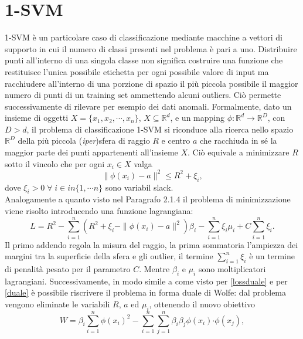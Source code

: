 \documentclass [11pt,a4paper,twoside,openright] {book}
\begin{document}
\section{1-SVM}
1-SVM è un particolare caso di classificazione mediante macchine a vettori di supporto in cui il numero di classi presenti nel problema è pari a uno. Distribuire punti all'interno di una singola classe non significa costruire una funzione che restituisce l'unica possibile etichetta per ogni possibile valore di input ma racchiudere all'interno di una porzione di spazio il più piccola possibile il maggior numero di punti di un training set ammettendo alcuni outliers. Ciò permette successivamente di rilevare per esempio dei dati anomali. Formalmente, dato un insieme di oggetti $X = \lbrace x_1, x_2, \cdots, x_n \rbrace$, $X \subseteq \mathbb{R}^d$, e un mapping $\phi: \mathbb{R}^d \rightarrow \mathbb{R}^D$, con $D > d$, il problema di classificazione 1-SVM si riconduce alla ricerca nello spazio $\mathbb{R}^D$ della più piccola (\textit{iper})sfera di raggio $R$ e centro $a$ che racchiuda in sé la maggior parte dei punti appartenenti all'insieme $X$. Ciò equivale a minimizzare $R$ sotto il vincolo che per ogni $x_i \in X$ valga
\begin{equation}
\parallel \phi(x_i) - a \parallel^2 \leq R^2 + \xi_i,
\end{equation}
dove $\xi_i > 0 \; \forall \; i \in in \lbrace 1, \cdots n \rbrace$  sono variabil slack.\\
Analogamente a quanto visto nel Paragrafo 2.1.4 il problema di minimizzazione viene risolto introducendo una funzione lagrangiana:
\begin{equation}
L = R^2 - \sum_{i=1}^n (R^2 + \xi_i - \parallel \phi(x_i) - a \parallel^2) \beta_i - \sum_{i=1}^n \xi_i \mu_i + C \sum_{i=1}^n \xi_i.
\end{equation}
Il primo addendo regola la misura del raggio, la prima sommatoria l'ampiezza dei margini tra la superficie della sfera e gli outlier, il termine $\sum_{i=1}^n\xi_i$ è un termine di penalità pesato per il parametro $C$. Mentre $\beta_i$ e $\mu_i$ sono moltiplicatori lagrangiani. Successivamente, in modo simile a come visto per \ref{lossduale} e per \ref{duale} è possibile riscrivere il problema in forma duale di Wolfe\cite{wolfe1961duality}: dal problema vengono eliminate le variabili $R$, $a$ ed $\mu_i$, ottenendo il nuovo obiettivo
\begin{equation}
W = \beta_i\sum_{i=1}^n\phi(x_i)^2 - \sum_{i=1}^n\sum_{j=1}^n\beta_i\beta_j\phi(x_i)\boldsymbol{\cdot}\phi(x_j),
\end{equation}
\end{document}
